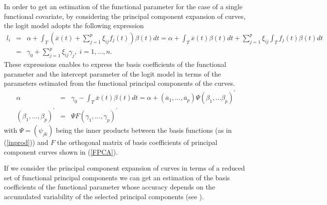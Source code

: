 In order to get an estimation of the functional parameter for the case of a single functional covariate, by considering the principal component expansion of curves, the logit model adopts the following expression
\begin{eqnarray*}
l_{i}&=&\alpha +\int_{T} \left(\overline{x}(t) + \sum_{j=1}^{p }\xi _{ij}f_{j}\left( t\right) \right)  \beta \left( t\right)dt
=\alpha
+\int_{T} \overline{x}(t) \beta \left( t\right)dt + \sum_{j=1}^{p }\xi _{ij} \int_{T} f_{j}\left( t\right) \beta \left( t\right)dt \\
&=&\gamma_0+\sum_{j=1}^{p }\xi _{ij} \gamma_j,\;i=1,\ldots ,n.
\end{eqnarray*}
These expressions enables to express the basis coefficients of the functional parameter and the intercept parameter of the logit model in terms of the parameters estimated from the functional principal components of the curves.
\begin{eqnarray}
\alpha &=& \gamma_0 - \int_{T} \overline{x}(t) \beta \left( t\right)dt = \alpha +(\overline{a}_1,\ldots,\overline{a}_p) \Psi (\beta_1,\ldots\beta_p)^{\prime} \label{Intercept} \\
(\beta_1,\ldots,\beta_p)^{\prime} &=& \Psi F (\gamma_1,\ldots, \gamma_p)^{\prime}
\label{pclogitfun}
\end{eqnarray}
with $\Psi=\left(\psi _{jk}\right)$ being the inner products between the basis functions (as in (\ref{inprod})) and $F$ the orthogonal matrix of basis coefficients of principal component curves shown in (\ref{FPCA}).

If we consider the principal component expansion of curves in terms of a reduced set of functional principal components we can get an estimation of the basis coefficients of the functional parameter whose accuracy depends on the accumulated variability of the selected principal components (see \cite{Escabias04}).

